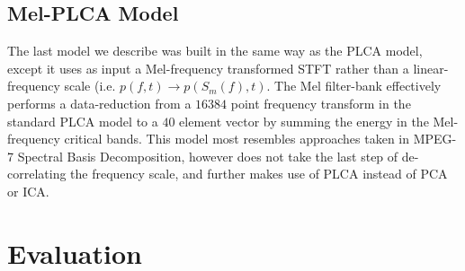 \documentclass[a4paper,10pt,final]{ThesisStyle}
\begin{document}


\subsection{Mel-PLCA Model}

The last model we describe was built in the same way as the PLCA model, except it uses as input a Mel-frequency transformed STFT rather than a linear-frequency scale (i.e. $p(f,t) \rightarrow p(S_m(f),t)$.  The Mel filter-bank effectively performs a data-reduction from a $16384$ point frequency transform in the standard PLCA model to a $40$ element vector by summing the energy in the Mel-frequency critical bands.  This model most resembles approaches taken in MPEG-7 Spectral Basis Decomposition, however does not take the last step of de-correlating the frequency scale, and further makes use of PLCA instead of PCA or ICA.  %

\section{Evaluation}


\end{document}
